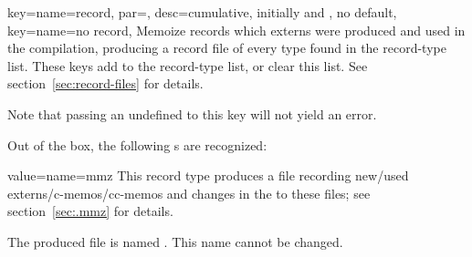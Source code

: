\documentclass[a4paper,11pt]{article}
\begin{document}
\begin{doc}{
    key={name=record, par=,
      desc={cumulative, initially  and , no default}},
    key={name=no record},
  }
  Memoize records which externs were produced and used in the compilation,
  producing a record file of every type found in the record-type list.  These
  keys add  to the record-type list, or clear this list.  See
  section~\ref{sec:record-files} for details.

  Note that passing an undefined  to this key will not yield
  an error.

  Out of the box, the following s are recognized:
  \begin{doc}{value={name=mmz}}
    This record type produces a \dmmz file recording new/used
    externs/c-memos/cc-memos and changes in the  to these
    files; see section~\ref{sec:.mmz} for details.

    The produced file is named . This name cannot be changed.


\end{doc}
\end{doc}
\end{document}
